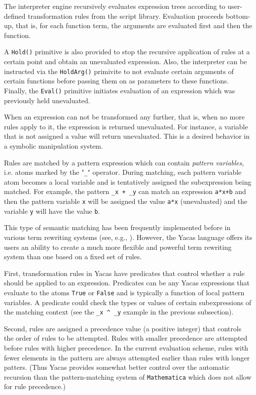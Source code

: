 \documentclass{llncs}
\begin{document}
The interpreter engine recursively evaluates expression trees according to
user-defined transformation rules from the script library.
Evaluation proceeds bottom-up, that is, for each function term, the arguments are evaluated first and then the function.


A \texttt{Hold()} primitive is also provided to stop the recursive
application of rules at a certain point and obtain an unevaluated expression.
Also, the interpreter can be instructed via the \texttt{HoldArg()} primivite to
not evaluate certain arguments of certain functions before passing them on as parameters to these functions. Finally, the \texttt{Eval()} primitive initiates evaluation of an expression which was previously held unevaluated.


When an expression can not be transformed any further, that is, when no more rules apply to it, the expression is returned
unevaluated. For instance, a variable that is not assigned a value will
return unevaluated. This is a desired behavior in a symbolic manipulation
system.


Rules are matched by a pattern expression which can contain \emph{pattern variables}, i.e. atoms marked by the "\verb|_|" operator. During matching, each pattern variable atom becomes a local variable and is tentatively assigned the subexpression being matched. For example, the pattern \verb|_x + _y| can match an expression \texttt{a*x+b} and then the pattern variable \texttt{x} will be assigned the value \texttt{a*x} (unevaluated) and the variable \texttt{y} will have the value \texttt{b}.


This type of semantic matching has been frequently implemented before in
various term rewriting systems (see, e.g., \cite{C86}). However, the Yacas language
offers its users an ability to create a much more flexible and powerful term
rewriting system than one based on a fixed set of rules.


First, transformation rules in Yacas have predicates that control whether a
rule should be applied to an expression. Predicates can be any Yacas
expressions that evaluate to the atoms \texttt{True} or \texttt{False} and is typically a
function of local pattern variables. A predicate could check the types or
values of certain subexpressions of the matching context (see the \verb|_x ^ _y|
example in the previous subsection).


Second, rules are assigned a precedence value (a positive integer) that
controls the order of rules to be attempted. Rules with smaller precedence are
attempted before rules with higher precedence. In the current evaluation
scheme, rules with fewer elements in the pattern are always attempted earlier
than rules with longer patters. (Thus Yacas provides somewhat better control
over the automatic recursion than the pattern-matching system of \texttt{Mathematica}
which does not allow for rule precedence.)
\end{document}
